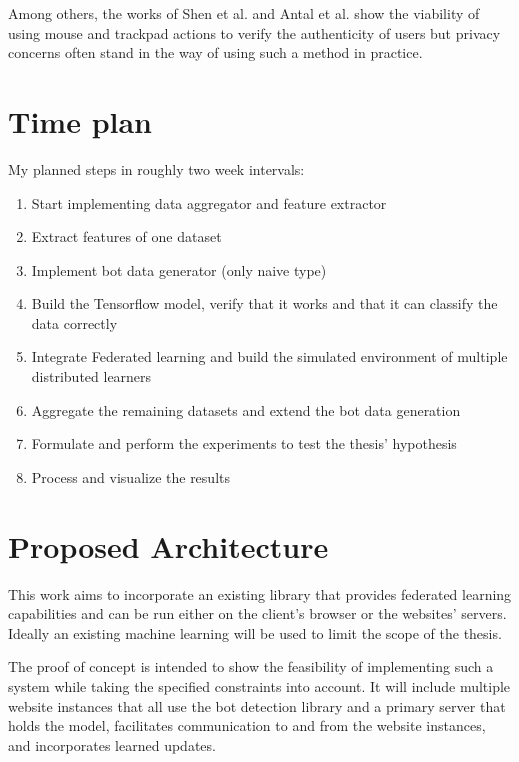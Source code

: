 \documentclass[
    fontsize=12pt,
    headings=small,
    parskip=half,           %
    bibliography=totoc,
    numbers=noenddot,       %
    open=any,               %
    final                   %
    ]{scrreprt}
\begin{document}
Among others, the works of Shen et al. \cite{6263955} and Antal et al. \cite{9111596} \cite{DBLP:journals/corr/abs-1810-04668} show the viability of using mouse and trackpad actions to verify the authenticity of users but privacy concerns often stand in the way of using such a method in practice.

\chapter{Time plan}

My planned steps in roughly two week intervals: \\

\begin{enumerate}
	\item Start implementing data aggregator and feature extractor
	\item Extract features of one dataset
	\item Implement bot data generator (only naive type)
	\item Build the Tensorflow model, verify that it works and that it can classify the data correctly
	\item Integrate Federated learning and build the simulated environment of multiple distributed learners
	\item Aggregate the remaining datasets and extend the bot data generation
	\item Formulate and perform the experiments to test the thesis' hypothesis
	\item Process and visualize the results
\end{enumerate}

\iffalse %

\chapter{Proposed Architecture}

This work aims to incorporate an existing library that provides federated learning capabilities and can be run either on the client's browser or the websites' servers. Ideally an existing machine learning will be used to limit the scope of the thesis.

The proof of concept is intended to show the feasibility of implementing such a system while taking the specified constraints into account. It will include multiple website instances that all use the bot detection library and a primary server that holds the model, facilitates communication to and from the website instances, and incorporates learned updates.
\end{document}
